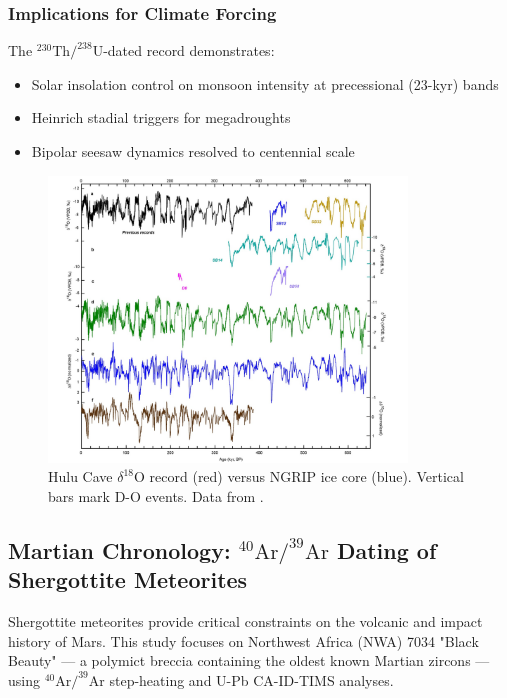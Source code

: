 \documentclass{article}
\begin{document}
\subsubsection*{Implications for Climate Forcing}
The \(^{230}\text{Th}/^{238}\text{U}\)-dated record demonstrates:
\begin{itemize}
    \item Solar insolation control on monsoon intensity at precessional (23-kyr) bands
    \item Heinrich stadial triggers for megadroughts
    \item Bipolar seesaw dynamics resolved to centennial scale
\end{itemize}

\begin{figure}[htbp]
    \centering
    \includegraphics[width=0.85\textwidth]{hulu_dansgaard.png}
    \caption{Hulu Cave \(\delta^{18}\text{O}\) record (red) versus NGRIP ice core (blue). Vertical bars mark D-O events. Data from \cite{Cheng2016}.}
    \label{fig:d_o_curve}
\end{figure}

 \subsection{Martian Chronology: \(^{40}\text{Ar}/^{39}\text{Ar}\) Dating of Shergottite Meteorites}
\label{subsec:martian_case}

Shergottite meteorites provide critical constraints on the volcanic and impact history of Mars. This study focuses on Northwest Africa (NWA) 7034 "Black Beauty" — a polymict breccia containing the oldest known Martian zircons — using \(^{40}\text{Ar}/^{39}\text{Ar}\) step-heating and U-Pb CA-ID-TIMS analyses.
\end{document}
